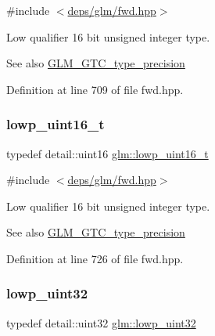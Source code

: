{\ttfamily \#include $<$\hyperlink{fwd_8hpp}{deps/glm/fwd.\+hpp}$>$}

Low qualifier 16 bit unsigned integer type. \begin{DoxySeeAlso}{See also}
\hyperlink{group__gtc__type__precision}{G\+L\+M\+\_\+\+G\+T\+C\+\_\+type\+\_\+precision} 
\end{DoxySeeAlso}


Definition at line 709 of file fwd.\+hpp.

\mbox{\label{group__gtc__type__precision_ga9a71176a4e5bc61951f9e9197d9c80e1}} 
\subsubsection{\texorpdfstring{lowp\+\_\+uint16\+\_\+t}{lowp\_uint16\_t}}
{\footnotesize\ttfamily typedef detail\+::uint16 \hyperlink{group__gtc__type__precision_ga9a71176a4e5bc61951f9e9197d9c80e1}{glm\+::lowp\+\_\+uint16\+\_\+t}}



{\ttfamily \#include $<$\hyperlink{fwd_8hpp}{deps/glm/fwd.\+hpp}$>$}

Low qualifier 16 bit unsigned integer type. \begin{DoxySeeAlso}{See also}
\hyperlink{group__gtc__type__precision}{G\+L\+M\+\_\+\+G\+T\+C\+\_\+type\+\_\+precision} 
\end{DoxySeeAlso}


Definition at line 726 of file fwd.\+hpp.

\mbox{\label{group__gtc__type__precision_gaf11e85af414720b4cd12bd57b3a81e68}} 
\subsubsection{\texorpdfstring{lowp\+\_\+uint32}{lowp\_uint32}}
{\footnotesize\ttfamily typedef detail\+::uint32 \hyperlink{group__gtc__type__precision_gaf11e85af414720b4cd12bd57b3a81e68}{glm\+::lowp\+\_\+uint32}}



